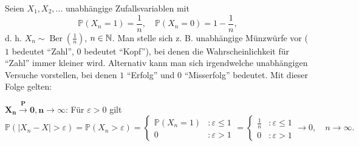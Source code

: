 \begin{beispiel}\label{Adam}
	Seien $X_1, X_2, ... $ unabh\"angige Zufallsvariablen mit $$\mathbb{P}(X_n = 1) = \frac{1}{n}, \quad \mathbb{P}(X_n = 0) = 1 - \frac{1}{n},$$ d. h. $X_n \sim \operatorname{Ber}(\frac{1}{n})$, $n \in \mathbb{N}$. Man stelle sich z. B. unabh\"angige M\"unzw\"urfe vor ($1$ bedeutet \enquote{Zahl}, $0$ bedeutet \enquote{Kopf}), bei denen die Wahrscheinlichkeit f\"ur \enquote{Zahl} immer kleiner wird. Alternativ kann man sich irgendwelche unabh\"angigen Versuche vorstellen, bei denen $1$ \enquote{Erfolg} und $0$ \enquote{Misserfolg} bedeutet. Mit dieser Folge gelten:\smallskip
	
	$\mathbf{X_n \overset{P}{\longrightarrow}0, n \to \infty}$:
	Für $\varepsilon > 0$ gilt 
	\[ \mathbb{P}(|X_n - X| > \varepsilon) = \mathbb{P}(X_n > \varepsilon) = 
	\begin{cases} 
	\mathbb{P}(X_n = 1)&: \varepsilon\leq 1\\
	0&: \varepsilon> 1
	\end{cases}
	 = 
	 \begin{cases}
		 \frac{1}{n}&: \varepsilon\leq 1\\
		 0 &: \varepsilon >1
	\end{cases}	 
		 \to 0, \quad n \to \infty.
		  \]
	

\end{beispiel}
